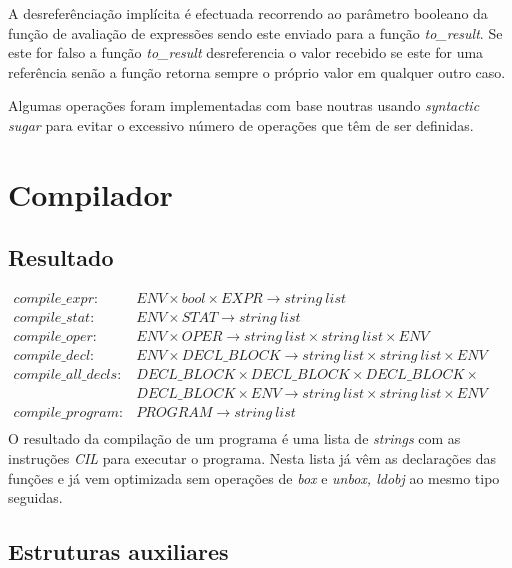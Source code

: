 A desreferênciação implícita é efectuada recorrendo ao parâmetro booleano da função de avaliação de expressões sendo este enviado para a função \emph{to\_result}. Se este for falso a função \emph{to\_result} desreferencia o valor recebido se este for uma referência senão a função retorna sempre o próprio valor em qualquer outro caso.

\vspace{\baselineskip}

Algumas operações foram implementadas com base noutras usando \emph{syntactic sugar} para evitar o excessivo número de operações que têm de ser definidas.

\newpage
\section{Compilador}

\subsection{Resultado}
{
\fontsize{9pt}{10}\selectfont
\ttfamily
$
\begin{array}{lll}
compile\_expr:			&ENV \times bool \times EXPR \rightarrow string~list\\
compile\_stat:			&ENV \times STAT \rightarrow string~list\\
compile\_oper:			&ENV \times	OPER \rightarrow string~list \times string~list \times ENV\\
compile\_decl:			&ENV \times DECL\_BLOCK \rightarrow string~list \times string~list \times ENV\\
compile\_all\_decls:	&DECL\_BLOCK \times DECL\_BLOCK \times DECL\_BLOCK \times \\
						&DECL\_BLOCK \times ENV \rightarrow string~list \times string~list \times ENV\\
compile\_program:	&PROGRAM \rightarrow string~list\\
\end{array}
$
}\\

O resultado da compilação de um programa é uma lista de \emph{strings} com as instruções \emph{CIL} para executar o programa. Nesta lista já vêm as declarações das funções e já vem optimizada sem operações de \emph{box} e \emph{unbox, ldobj} ao mesmo tipo seguidas.

\subsection{Estruturas auxiliares}

